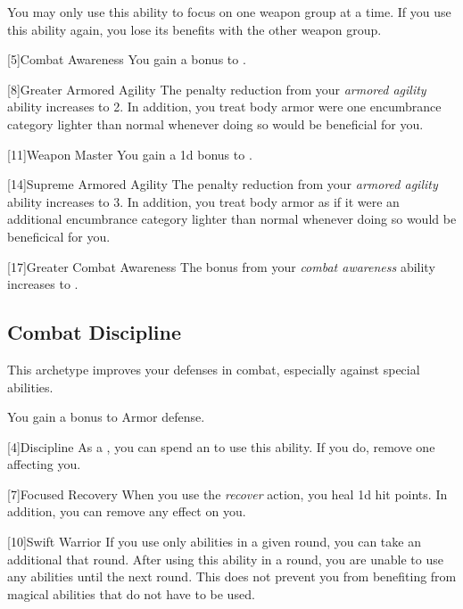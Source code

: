         You may only use this ability to focus on one weapon group at a time.
        If you use this ability again, you lose its benefits with the other weapon group.

        [5]{Combat Awareness}
        You gain a  bonus to .

        [8]{Greater Armored Agility}
        The penalty reduction from your \textit{armored agility} ability increases to 2.
        In addition, you treat body armor were one encumbrance category lighter than normal whenever doing so would be beneficial for you.

        [11]{Weapon Master} 
        You gain a \plus1d bonus to .

        [14]{Supreme Armored Agility}
        The penalty reduction from your \textit{armored agility} ability increases to 3.
        In addition, you treat body armor as if it were an additional encumbrance category lighter than normal whenever doing so would be beneficical for you.

        [17]{Greater Combat Awareness} 
        The bonus from your \textit{combat awareness} ability increases to .

    \subsection{Combat Discipline}
        This archetype improves your defenses in combat, especially against special abilities.

        You gain a  bonus to Armor defense.

        [4]{Discipline} As a , you can spend an  to use this ability.
        If you do, remove one  affecting you.

        [7]{Focused Recovery}
        When you use the \textit{recover} action, you heal \plus1d hit points.
        In addition, you can remove any  effect on you.

        [10]{Swift Warrior}
        If you use only  abilities in a given round, you can take an additional  that round.
        After using this ability in a round, you are unable to use any  abilities until the next round.
        This does not prevent you from benefiting from magical abilities that do not have to be used.

